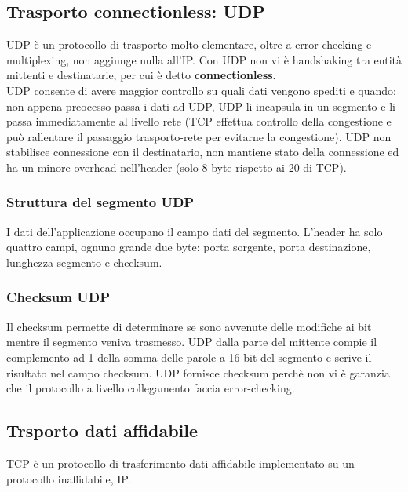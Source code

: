 \documentclass[11pt]{article}
\begin{document}
\subsection{Trasporto connectionless: UDP}
UDP è un protocollo di trasporto molto elementare, oltre a error checking e multiplexing, non aggiunge
nulla all'IP. Con UDP non vi è handshaking tra entità mittenti e destinatarie, per cui è detto \textbf{connectionless}.\\
UDP consente di avere maggior controllo su quali dati vengono spediti e quando: non appena preocesso passa i dati ad UDP,
UDP li incapsula in un segmento e li passa immediatamente al livello rete (TCP effettua controllo della congestione e 
può rallentare il passaggio trasporto-rete per evitarne la congestione). UDP non stabilisce connessione con il
destinatario, non mantiene stato della connessione ed ha un minore overhead nell'header (solo 8 byte rispetto ai 20 di 
TCP).
\subsubsection{Struttura del segmento UDP}
I dati dell'applicazione occupano il campo dati del segmento. L'header ha solo quattro campi, ognuno grande due byte:
porta sorgente, porta destinazione, lunghezza segmento e checksum.
\subsubsection{Checksum UDP}
Il checksum permette di determinare se sono avvenute delle modifiche ai bit mentre il segmento veniva trasmesso. UDP
dalla parte del mittente compie il complemento ad 1 della somma delle parole a 16 bit del segmento e scrive il risultato
nel campo checksum. UDP fornisce checksum perchè non vi è garanzia che il protocollo a livello collegamento faccia 
error-checking.
\subsection{Trsporto dati affidabile}
TCP è un protocollo di trasferimento dati affidabile implementato su un protocollo inaffidabile, IP. 
\end{document}
